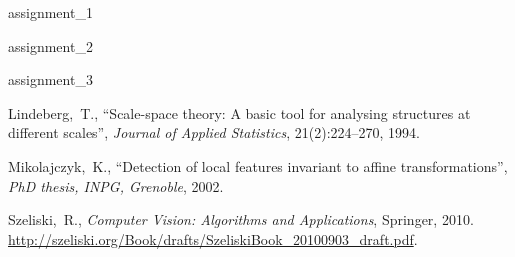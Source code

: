 \documentclass[a4paper,psfig,subfigure,epsfig,ausarbeitung,amssmb,float,caption,fontenc]{article}
\begin{document}
%
%
%
%

 {assignment_1}
\FloatBarrier %

 {assignment_2}
\FloatBarrier %

 {assignment_3}
\FloatBarrier %



\fontsize{9}{10pt}


\begin{thebibliography}{10}


Lindeberg,~T.,
\newblock ``Scale-space theory: A basic tool for analysing structures at different scales'',
\newblock \textit{Journal of Applied Statistics}, 21(2):224–270, 1994.

Mikolajczyk,~K.,
\newblock ``Detection of local features invariant to affine transformations'',
\newblock \textit{PhD thesis, INPG, Grenoble}, 2002.

Szeliski,~R.,
\newblock \textit{Computer Vision: Algorithms and Applications},
\newblock Springer, 2010.
\newblock \url{http://szeliski.org/Book/drafts/SzeliskiBook_20100903_draft.pdf}.

\end{thebibliography}
\end{document}
